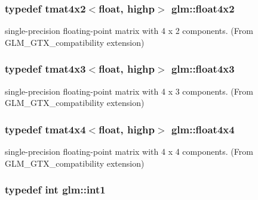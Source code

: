 \subsubsection[{float4x2}]{\setlength{\rightskip}{0pt plus 5cm}typedef tmat4x2$<$float, highp$>$ {\bf glm\+::float4x2}}\label{group__gtx__compatibility_ga4cb477bf8e9167ab065aa70c7767e329}


single-\/precision floating-\/point matrix with 4 x 2 components. (From G\+L\+M\+\_\+\+G\+T\+X\+\_\+compatibility extension) 

\hypertarget{group__gtx__compatibility_gaa0c1ca31e5e064223cc7cfc0344ac787}{}
\subsubsection[{float4x3}]{\setlength{\rightskip}{0pt plus 5cm}typedef tmat4x3$<$float, highp$>$ {\bf glm\+::float4x3}}\label{group__gtx__compatibility_gaa0c1ca31e5e064223cc7cfc0344ac787}


single-\/precision floating-\/point matrix with 4 x 3 components. (From G\+L\+M\+\_\+\+G\+T\+X\+\_\+compatibility extension) 

\hypertarget{group__gtx__compatibility_ga67688a2f2fc6386544d1a47a5d430467}{}
\subsubsection[{float4x4}]{\setlength{\rightskip}{0pt plus 5cm}typedef tmat4x4$<$float, highp$>$ {\bf glm\+::float4x4}}\label{group__gtx__compatibility_ga67688a2f2fc6386544d1a47a5d430467}


single-\/precision floating-\/point matrix with 4 x 4 components. (From G\+L\+M\+\_\+\+G\+T\+X\+\_\+compatibility extension) 

\hypertarget{group__gtx__compatibility_gaba41d7803e4b24c17656d74377b88286}{}
\subsubsection[{int1}]{\setlength{\rightskip}{0pt plus 5cm}typedef int {\bf glm\+::int1}}\label{group__gtx__compatibility_gaba41d7803e4b24c17656d74377b88286}


